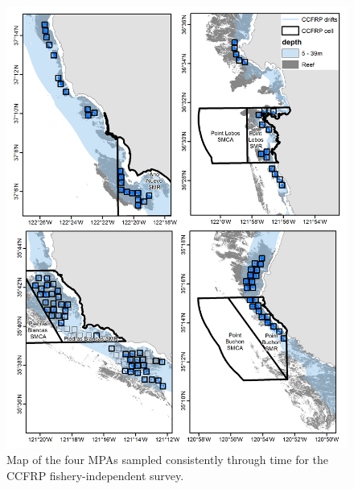 \documentclass[12pt,]{article}
\begin{document}
\FloatBarrier 

\begin{figure}
\centering
\includegraphics{Figures/CCFRP_sites.png}
\caption{Map of the four MPAs sampled consistently through time for the
CCFRP fishery-independent survey. \label{fig:CCFRP_sites}}
\end{figure}

\FloatBarrier
\end{document}
